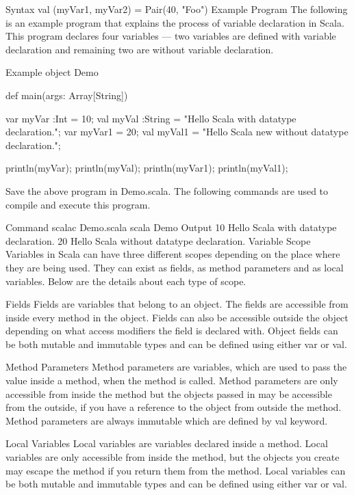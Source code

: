 Syntax
val (myVar1, myVar2) = Pair(40, "Foo")
Example Program
The following is an example program that explains the process of variable declaration in Scala. This program declares four variables — two variables are defined with variable declaration and remaining two are without variable declaration.

Example
object Demo {
   def main(args: Array[String]) {
      var myVar :Int = 10;
      val myVal :String = "Hello Scala with datatype declaration.";
      var myVar1 = 20;
      val myVal1 = "Hello Scala new without datatype declaration.";
      
      println(myVar); println(myVal); println(myVar1); 
      println(myVal1);
   }
}
Save the above program in Demo.scala. The following commands are used to compile and execute this program.

Command
\>scalac Demo.scala
\>scala Demo
Output
10
Hello Scala with datatype declaration.
20
Hello Scala without datatype declaration.
Variable Scope
Variables in Scala can have three different scopes depending on the place where they are being used. They can exist as fields, as method parameters and as local variables. Below are the details about each type of scope.

Fields
Fields are variables that belong to an object. The fields are accessible from inside every method in the object. Fields can also be accessible outside the object depending on what access modifiers the field is declared with. Object fields can be both mutable and immutable types and can be defined using either var or val.

Method Parameters
Method parameters are variables, which are used to pass the value inside a method, when the method is called. Method parameters are only accessible from inside the method but the objects passed in may be accessible from the outside, if you have a reference to the object from outside the method. Method parameters are always immutable which are defined by val keyword.

Local Variables
Local variables are variables declared inside a method. Local variables are only accessible from inside the method, but the objects you create may escape the method if you return them from the method. Local variables can be both mutable and immutable types and can be defined using either var or val.
